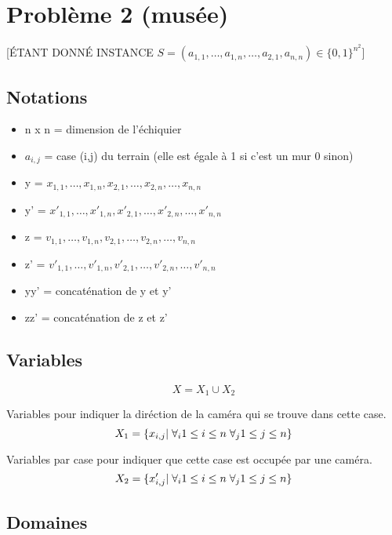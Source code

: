 \documentclass[a4paper,11pt]{article}
\begin{document}
\section {Problème 2 (musée)}
[ÉTANT DONNÉ INSTANCE $S = (a_{1,1},\dots,a_{1,n},\dots,a_{2,1},a_{n,n}) \in \{0,1\}^{n^2}$]

\subsection{Notations}
\begin{itemize}
\item n x n = dimension de l'échiquier
\item $a_{i,j}$ = case (i,j) du terrain (elle est égale à 1 si c'est un mur 0 sinon)
\item y = $x_{1,1},\ldots, x_{1,n},x_{2,1}, \ldots,x_{2,n}, \ldots, x_{n,n} $
\item y' = $x'_{1,1},\ldots, x'_{1,n},x'_{2,1}, \ldots,x'_{2,n}, \ldots, x'_{n,n} $
\item z = $v_{1,1},\ldots, v_{1,n},v_{2,1}, \ldots,v_{2,n}, \ldots, v_{n,n} $
\item z' = $v'_{1,1},\ldots, v'_{1,n},v'_{2,1}, \ldots,v'_{2,n}, \ldots, v'_{n,n} $
\item yy' = concaténation de y et y'
\item zz' = concaténation de z et z'

\end{itemize}

\subsection{Variables}

$$X = X_1 \cup X_2$$

Variables pour indiquer la diréction de la caméra qui se trouve dans cette case.
$$X_1 = \{x_{i,j} | \hspace{0.1cm} \forall_{i} 1 \leq i \leq n \hspace{0.1cm} \forall_{j} 1 \leq j \leq n\}$$

Variables par case pour indiquer que cette case est occupée par une caméra.
$$X_2 = \{x'_{i,j} | \hspace{0.1cm} \forall_{i} 1 \leq i \leq n \hspace{0.1cm} \forall_{j} 1 \leq j \leq n\}$$

\subsection{Domaines}
\end{document}
